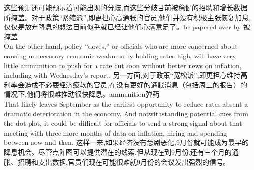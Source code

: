 \documentclass[a4paper,12pt]{article}
\begin{document}
这些预测还可能预示着可能出现的分歧,而这些分歧目前被稳健的招聘和增长数据所掩盖。对于政策“紧缩派”,即更担心高通胀的官员,他们并没有积极主张恢复加息,仅仅是放弃降息的想法目前似乎就已经让他们心满意足了。be papered over by 被掩盖
\\On the other hand, policy “doves,” or officials who are more concerned about causing unnecessary economic weakness by holding rates high, will have very little ammunition to push for a rate cut soon without better news on inflation, including with Wednesday's report. 
另一方面,对于政策“宽松派”,即更担心维持高利率会造成不必要经济疲软的官员,在没有更好的通胀消息（包括周三的报告）的情况下,他们将很难推动很快降息。ammunition弹药 
\\That likely leaves September as the earliest opportunity to reduce rates absent a dramatic deterioration in the economy. And notwithstanding potential cues from the dot plot, it could be difficult for officials to send a strong signal about that meeting with three more months of data on inflation, hiring and spending between now and then. 
这样一来,如果经济没有急剧恶化,9月份就可能成为最早的降息机会。尽管点阵图可以提供潜在的线索,但从现在到9月份,还有三个月的通胀、招聘和支出数据,官员们现在可能很难就9月份的会议发出强烈的信号。
\end{document}
